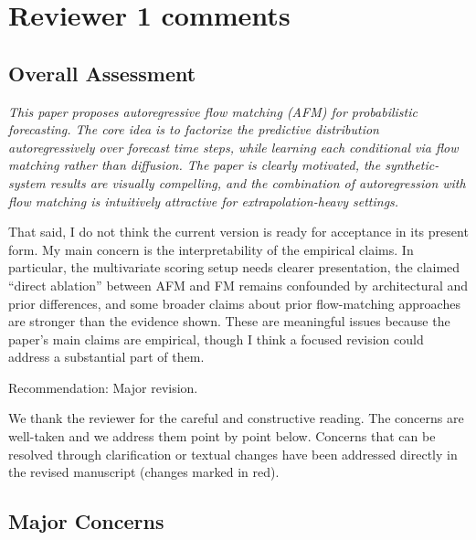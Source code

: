\documentclass[11pt]{article}
\newcommand{\reviewertext}[1]{%
  \begin{reviewerquote}
    {\color{reviewercolor}\itshape #1}
  \end{reviewerquote}%
}
\newcommand{\authorresponse}[1]{%
    #1\par\medskip
}
\begin{document}
\section{Reviewer 1 comments}

\subsection{Overall Assessment}

\reviewertext{%
This paper proposes autoregressive flow matching (AFM) for probabilistic forecasting. The core idea is to factorize the predictive distribution autoregressively over forecast time steps, while learning each conditional via flow matching rather than diffusion. The paper is clearly motivated, the synthetic-system results are visually compelling, and the combination of autoregression with flow matching is intuitively attractive for extrapolation-heavy settings.

That said, I do not think the current version is ready for acceptance in its present form. My main concern is the interpretability of the empirical claims. In particular, the multivariate scoring setup needs clearer presentation, the claimed ``direct ablation'' between AFM and FM remains confounded by architectural and prior differences, and some broader claims about prior flow-matching approaches are stronger than the evidence shown. These are meaningful issues because the paper's main claims are empirical, though I think a focused revision could address a substantial part of them.

Recommendation: Major revision.
}

\authorresponse{%
We thank the reviewer for the careful and constructive reading. The concerns are well-taken and we address them point by point below. Concerns that can be resolved through clarification or textual changes have been addressed directly in the revised manuscript (changes marked in red).
}

\subsection{Major Concerns}
\end{document}

